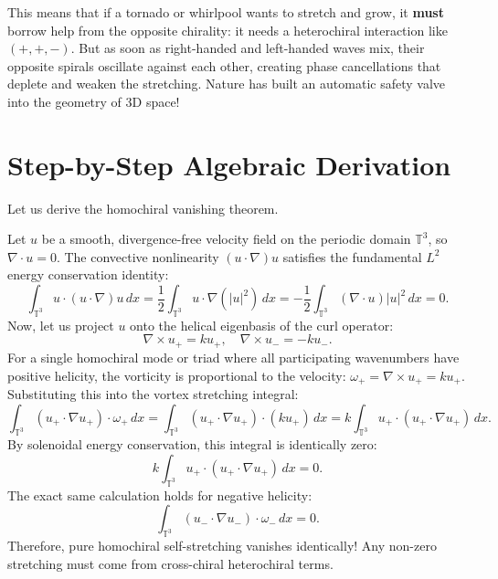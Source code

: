 \documentclass[11pt,a4paper]{article}
\theoremstyle{definition}
\begin{document}
This means that if a tornado or whirlpool wants to stretch and grow, it \textbf{must} borrow help from the opposite chirality: it needs a heterochiral interaction like $(+, +, -)$. But as soon as right-handed and left-handed waves mix, their opposite spirals oscillate against each other, creating phase cancellations that deplete and weaken the stretching. Nature has built an automatic safety valve into the geometry of 3D space!


\section{Step-by-Step Algebraic Derivation}

Let us derive the homochiral vanishing theorem.

Let $u$ be a smooth, divergence-free velocity field on the periodic domain $\mathbb{T}^3$, so $\nabla \cdot u = 0$. The convective nonlinearity $(u \cdot \nabla) u$ satisfies the fundamental $L^2$ energy conservation identity:
\begin{equation}
\int_{\mathbb{T}^3} u \cdot (u \cdot \nabla) u \, dx = \frac{1}{2} \int_{\mathbb{T}^3} u \cdot \nabla (|u|^2) \, dx = -\frac{1}{2} \int_{\mathbb{T}^3} (\nabla \cdot u) |u|^2 \, dx = 0.
\end{equation}
Now, let us project $u$ onto the helical eigenbasis of the curl operator:
\begin{equation}
\nabla \times u_+ = k u_+, \quad \nabla \times u_- = -k u_-.
\end{equation}
For a single homochiral mode or triad where all participating wavenumbers have positive helicity, the vorticity is proportional to the velocity: $\omega_+ = \nabla \times u_+ = k u_+$.
Substituting this into the vortex stretching integral:
\begin{equation}
\int_{\mathbb{T}^3} (u_+ \cdot \nabla u_+) \cdot \omega_+ \, dx = \int_{\mathbb{T}^3} (u_+ \cdot \nabla u_+) \cdot (k u_+) \, dx = k \int_{\mathbb{T}^3} u_+ \cdot (u_+ \cdot \nabla u_+) \, dx.
\end{equation}
By solenoidal energy conservation, this integral is identically zero:
\begin{equation}
k \int_{\mathbb{T}^3} u_+ \cdot (u_+ \cdot \nabla u_+) \, dx = 0.
\end{equation}
The exact same calculation holds for negative helicity:
\begin{equation}
\int_{\mathbb{T}^3} (u_- \cdot \nabla u_-) \cdot \omega_- \, dx = 0.
\end{equation}
Therefore, pure homochiral self-stretching vanishes identically! Any non-zero stretching must come from cross-chiral heterochiral terms.
\end{document}
